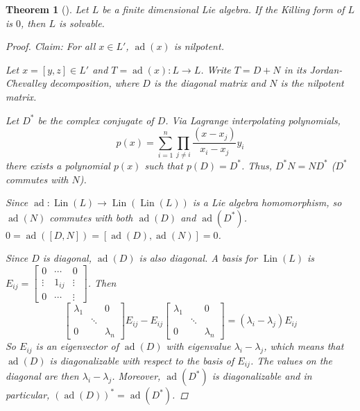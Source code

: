 \documentclass[letterpaper, 10pt]{article}
\theoremstyle{theostyle}
\newtheorem{theorem}{Theorem}[section]
\newenvironment{thmstyle}[1][]{%
    \begin{theorem}[#1]\leavevmode\vspace{-\baselineskip}\myquote%
    }{\endmyquote\end{theorem}}
\begin{document}
\begin{thmstyle}
    Let \(L\) be a finite dimensional Lie algebra.
    If the Killing form of \(L\) is \(0\), then \(L\) is solvable.
    \begin{proof}
    
    Claim: For all \(x \in L'\), \(\operatorname{ad}{(x)}\) is nilpotent.

    Let \(x = [y,z] \in L'\) and \(T = \operatorname{ad}{(x)}: L \rightarrow L\).
    Write \(T = D + N\) in its Jordan-Chevalley decomposition, where \(D\) is the diagonal matrix and \(N\) is the nilpotent matrix.

    Let \(D^\ast\) be the complex conjugate of \(D\).
    Via Lagrange interpolating polynomials,
    \[p(x) = \sum_{i=1}^{n} \prod_{j \neq i} \frac{(x-x_j)}{x_i-x_j}y_i\]
    there exists a polynomial \(p(x)\) such that \(p(D) = D^\ast\).
    Thus, \(D^\ast N = N D^\ast\) (\(D^\ast\) commutes with \(N\)).
    
    Since \(\operatorname{ad}: \operatorname{Lin}{(L)} \rightarrow \operatorname{Lin}{\left(\operatorname{Lin}{(L)}\right)}\)
    is a Lie algebra homomorphism, so \(\operatorname{ad}{(N)}\) commutes with both \(\operatorname{ad}{(D)}\) and \(\operatorname{ad}{(D^\ast)}\).
    \(0 = \operatorname{ad}{\left([D, N]\right)} = [\operatorname{ad}{(D)},\operatorname{ad}{(N)}] = 0\).

    Since \(D\) is diagonal, \(\operatorname{ad}{(D)}\) is also diagonal.
    A basis for \(\operatorname{Lin}{(L)}\) is \(E_{ij} = \begin{bmatrix}
        0 & \cdots & 0 \\
        \vdots & 1_{ij} & \vdots \\
        0 & \cdots & \vdots
    \end{bmatrix}\).
    Then
    \[\begin{bmatrix}
        \lambda_1 & & 0 \\
        & \ddots & \\
        0 & & \lambda_n
    \end{bmatrix} E_{ij} - E_{ij} \begin{bmatrix}
        \lambda_1 & & 0 \\
        & \ddots & \\
        0 & & \lambda_n
    \end{bmatrix}
    = \left(\lambda_i - \lambda_j\right)E_{ij}\]
    So \(E_{ij}\) is an eigenvector of \(\operatorname{ad}{(D)}\) with eigenvalue \(\lambda_i - \lambda_j\), which means that
    \(\operatorname{ad}{(D)}\) is diagonalizable with respect to the basis of \(E_{ij}\).
    The values on the diagonal are then \(\lambda_i - \lambda_j\).
    Moreover, \(\operatorname{ad}{(D^\ast)}\) is diagonalizable and in particular, \(\left(\operatorname{ad}{(D)}\right)^\ast = \operatorname{ad}{(D^\ast)}\).


\end{proof}
\end{thmstyle}
\end{document}
